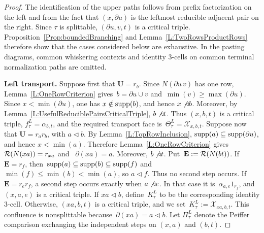 \documentclass[a4paper, twoside, 11pt, english]{article}
\begin{document}
\begin{proof}
The identification of the upper paths follows from prefix factorization
on the left and from the fact that $(x,\partial u)$ is the leftmost
reducible adjacent pair on the right.
Since $\tau$ is splittable, $(\partial u,v,t)$ is a critical triple.
Proposition~\ref{Prop:boundedBranching} and
Lemma~\ref{L:TwoRowsProductRows} therefore show that the cases considered
below are exhaustive.
In the pasting diagrams, common whiskering contexts and identity
$3$-cells on common terminal normalization paths are omitted.

\noindent
\textbf{Left transport.}
Suppose first that $\mathbf U=r_b$. Since $N(\partial u\,v)$ has one
row, Lemma~\ref{L:OneRowCriterion} gives~$b=\partial u\cup v$ and~$\min(v)\geq\max(\partial u)$.
Since $x<\min(\partial u)$, one has $x\notin\operatorname{supp}(b)$, and hence
$x\not\triangleleft b$. Moreover, by
Lemma~\ref{L:UsefulReduciblePairsCriticalTriple},
$b\not\triangleleft t$. Thus $(x,b,t)$ is a critical triple,
$f_\tau^L=\alpha_{b,t}$, and the required transport face is~$\Theta_\tau^L=\mathcal X_{x,b,t}$.
Suppose now that $\mathbf U=r_ar_b$, with $a\triangleleft b$. By
Lemma~\ref{L:TopRowInclusion},
$\operatorname{supp}(a)\subseteq\operatorname{supp}(\partial u)$, and hence $x<\min(a)$. Therefore
Lemma~\ref{L:OneRowCriterion} gives~$\mathcal{R}(N(xa))=r_{xa}$ and~
$\partial(xa)=a$.
Moreover, $b\not\triangleleft t$. Put~$\mathbf E:=\mathcal{R}(N(bt))$.
If $\mathbf E=r_f$, then~$\operatorname{supp}(a)\subseteq\operatorname{supp}(b)\subseteq\operatorname{supp}(f)$ and~$\min(f)\leq\min(b)<\min(a)$,
so $a\triangleleft f$. Thus no second step occurs. If
$\mathbf E=r_er_f$, a second step occurs exactly when
$a\not\triangleleft e$. In that case it is~$\alpha_{a,e}1_{r_f}$, and $(x,a,e)$ is a critical triple.
If $xa\triangleleft b$, define~$K_\tau^L$ to be the corresponding
identity $3$-cell. Otherwise, $(xa,b,t)$ is a critical triple, and we
set~$K_\tau^L:=\mathcal X_{xa,b,t}$. This confluence is nonsplittable
because~$\partial(xa)=a\triangleleft b$.
Let $\Pi_\tau^L$ denote the Peiffer comparison exchanging the independent
steps on $(x,a)$ and $(b,t)$.


\end{proof}
\end{document}
